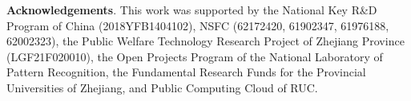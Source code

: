 \documentclass[sigconf]{acmart}
\begin{document}
\textbf{Acknowledgements}.
This work was supported by the National Key R\&D Program of China (2018YFB1404102), NSFC (62172420, 61902347, 61976188, 62002323), the Public Welfare Technology Research Project of Zhejiang Province (LGF21F020010), the Open Projects Program of the National Laboratory of Pattern Recognition, the Fundamental Research Funds for the Provincial Universities of Zhejiang, and Public Computing Cloud of RUC.
\end{document}
